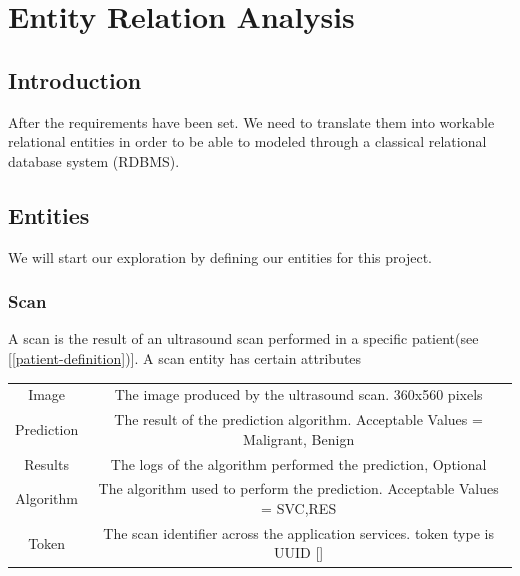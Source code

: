 \chapter{Entity Relation Analysis}
	
	\label{entity-relation-analysis}
	\section{Introduction}
	After the requirements have been set. We need to translate them into workable relational entities in order to be able to modeled through a classical
	relational database system (RDBMS).
	\section{Entities}
	We will start our exploration by defining our entities for this project.
	\subsection{Scan}
	A scan is the result of an ultrasound scan performed in a specific patient(see [\ref{patient-definition})]. A scan entity has certain attributes
	\begin{center}
		\begin{tabular}{ |c|c| } 
			\hline
			Image & The image produced by the ultrasound scan. 360x560 pixels\\
			Prediction & The result of the prediction algorithm. Acceptable Values = {Maligrant, Benign}  \\
			Results & The logs of the algorithm performed the prediction, Optional \\
			Algorithm & The algorithm used to perform the prediction. Acceptable Values = {SVC,RES} \\
			Token& The scan identifier across the application services. token type is UUID [\cite{rfc4122}] \\
			\hline
		\end{tabular}
	\end{center}
